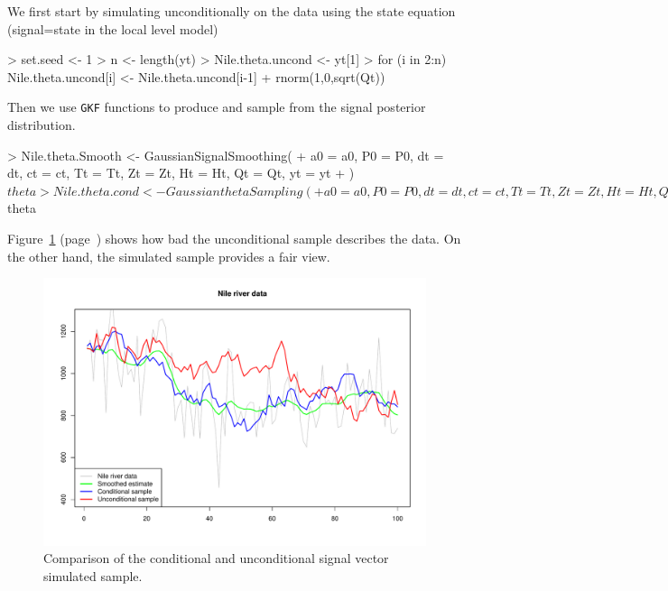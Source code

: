 \documentclass{article}
\newcommand{\GKF}{\texttt{GKF}\xspace}
\begin{document}
We first start by simulating unconditionally on the data using the state equation
(signal=state in the local level model)
\begin{Schunk}
\begin{Sinput}
> set.seed <- 1
> n <- length(yt)
> Nile.theta.uncond <- yt[1]
> for (i in 2:n) Nile.theta.uncond[i] <- Nile.theta.uncond[i-1] + rnorm(1,0,sqrt(Qt))
\end{Sinput}
\end{Schunk}
Then we use \GKF functions to produce and sample from the signal posterior distribution.
\begin{Schunk}
\begin{Sinput}
> Nile.theta.Smooth <- GaussianSignalSmoothing(
+     a0 = a0, P0 = P0, dt = dt, ct = ct, Tt = Tt, Zt = Zt, Ht = Ht, Qt = Qt, yt = yt
+               )$theta
> Nile.theta.cond <- GaussianthetaSampling(
+     a0 = a0, P0 = P0, dt = dt, ct = ct, Tt = Tt, Zt = Zt, Ht = Ht, Qt = Qt, yt = yt,
+          M = 1)$theta
\end{Sinput}
\end{Schunk}
Figure~\ref{fig:DiffSample} (page~\pageref{fig:DiffSample}) shows how bad the unconditional
sample describes the data. On the other hand, the simulated sample provides a fair view.
\begin{figure}[htbp]
  \centering
\includegraphics{vignette-025}
\caption{Comparison of the conditional and unconditional signal vector simulated sample.}
\label{fig:DiffSample}
\end{figure}
\end{document}
